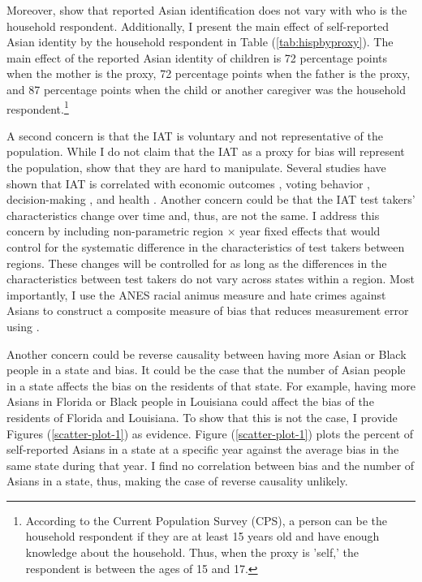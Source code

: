 Moreover, \textcite{duncanIntermarriageIntergenerationalTransmission2011} show that reported Asian identification does not vary with who is the household respondent. Additionally, I present the main effect of self-reported Asian identity by the household respondent in Table (\ref{tab:hispbyproxy}). The main effect of the reported Asian identity of children is 72 percentage points when the mother is the proxy, 72 percentage points when the father is the proxy, and 87 percentage points when the child or another caregiver was the household respondent.\footnote{According to the Current Population Survey (CPS), a person can be the household respondent if they are at least 15 years old and have enough knowledge about the household. Thus, when the proxy is 'self,' the respondent is between the ages of 15 and 17.} 

A second concern is that the IAT is voluntary and not representative of the population. While I do not claim that the IAT  as a proxy for bias will represent the population, \textcite{egloffPredictiveValidityImplicit2002} show that they are hard to manipulate. Several studies have shown that IAT is correlated with economic outcomes \autocite{chettyRaceEconomicOpportunity2020,gloverDiscriminationSelfFulfillingProphecy2017}, voting behavior \autocite{friesePredictingVotingBehavior2007}, decision-making \autocite{bertrandImplicitDiscrimination2005,carlanaImplicitStereotypesEvidence2019}, and health \autocite{leitnerRacialBiasAssociated2016}. Another concern could be that the IAT test takers' characteristics change over time and, thus, are not the same. I address this concern by including non-parametric region $\times$ year fixed effects that would control for the systematic difference in the characteristics of test takers between regions. These changes will be controlled for as long as the differences in the characteristics between test takers do not vary across states within a region. Most importantly, I use the ANES racial animus measure and hate crimes against Asians to construct a composite measure of bias that reduces measurement error using \textcite{lubotskyInterpretationRegressionsMultiple2006}.

Another concern could be reverse causality between having more Asian or Black people in a state and bias. It could be the case that the number of Asian people in a state affects the bias on the residents of that state. For example, having more Asians in Florida or Black people in Louisiana could affect the  bias of the residents of Florida and Louisiana. To show that this is not the case, I provide Figures (\ref{scatter-plot-1}) as evidence. Figure (\ref{scatter-plot-1}) plots the percent of self-reported Asians in a state at a specific year against the average  bias in the same state during that year. I find no correlation between bias and the number of Asians in a state, thus, making the case of reverse causality unlikely. 


